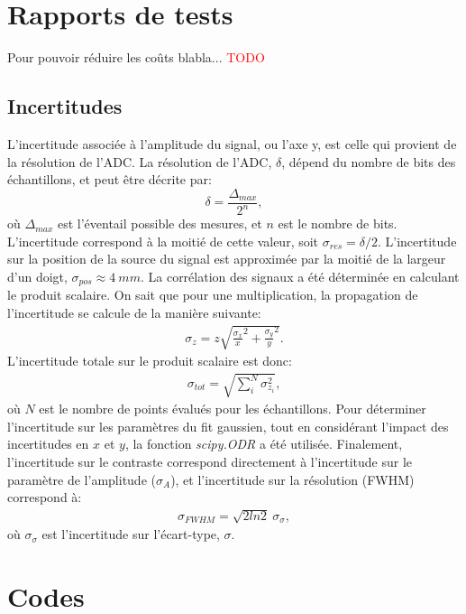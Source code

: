 \documentclass[11pt,letterpaper]{article}
\begin{document}


\section{Rapports de tests}






Pour pouvoir réduire les coûts blabla... \textcolor{red}{TODO}

\subsection{Incertitudes}
L'incertitude associée à l'amplitude du signal, ou l'axe y, est celle qui provient de la résolution 
de l'ADC. La résolution de l'ADC, $\delta$, dépend du nombre de bits des échantillons, et peut être décrite par:
\[\delta=\frac{\Delta_{max}}{2^{n}},\]
où $\Delta_{max}$ est l'éventail possible des mesures, et $n$ est le nombre de bits. L'incertitude correspond
à la moitié de cette valeur, soit $\sigma_{res}=\delta/2$. L'incertitude sur la position de la source du signal
est approximée par la moitié de la largeur d'un doigt, $\sigma_{pos}\approx4\ mm$. La corrélation des signaux a été déterminée
en calculant le produit scalaire. On sait que pour une multiplication, la propagation de l'incertitude se calcule de la
manière suivante:
\begin{align*}
  \sigma_{z}=z \sqrt{\frac{\sigma_x}{x}^2+\frac{\sigma_y}{y}^2}.
\end{align*}
L'incertitude totale sur le produit scalaire est donc:
\begin{align*}
  \sigma_{tot}=\sqrt{\sum_i^{N} \sigma_{z_i}^2},
\end{align*}
où $N$ est le nombre de points évalués pour les échantillons. Pour déterminer l'incertitude sur les
paramètres du fit gaussien, tout en considérant l'impact des incertitudes en $x$ et $y$, la fonction \textit{scipy.ODR}
a été utilisée. Finalement, l'incertitude sur le contraste correspond directement à l'incertitude sur le paramètre de
l'amplitude ($\sigma_{A}$), et l'incertitude sur la résolution (FWHM) correspond à:
\begin{align*}
  \sigma_{FWHM}=\sqrt{2ln2}\ \sigma_{\sigma},
\end{align*}
où $\sigma_{\sigma}$ est l'incertitude sur l'écart-type, $\sigma$.
\section{Codes}




\clearpage

% 
% 
\end{document}
